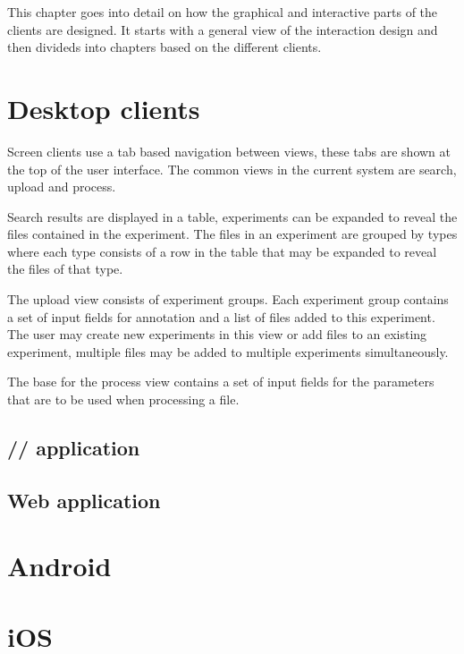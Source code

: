 
This chapter goes into detail on how the graphical and interactive parts of the clients are designed. It starts with a general view of the interaction design and then divideds into chapters based on the different clients.

\section{Desktop clients}
Screen clients use a tab based navigation between views, these tabs are shown at the top of the user interface. The common views in the current system are search, upload and process.

Search results are displayed in a table, experiments can be expanded to reveal the files contained in the experiment. The files in an experiment are grouped by types where each type consists of a row in the table that may be expanded to reveal the files of that type.

The upload view consists of experiment groups. Each experiment group contains a set of input fields for annotation and a list of files added to this experiment. The user may create new experiments in this view or add files to an existing experiment, multiple files may be added to multiple experiments simultaneously.

The base for the process view contains a set of input fields for the parameters that are to be used when processing a file.

\FloatBarrier
\subsection{// application}


\FloatBarrier
\subsection{Web application}


\FloatBarrier

\section{Android}

\FloatBarrier
\section{iOS}


